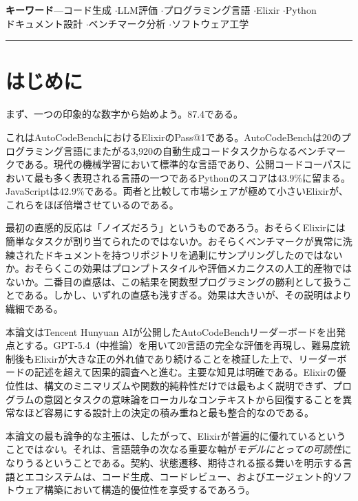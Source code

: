 \documentclass[11pt]{article}
\makeatletter
\newcommand{\acb}{AutoCodeBench}
\newcommand{\passatone}{Pass@1}
\newcommand{\elixir}{Elixir}
\newcommand{\pythonlang}{Python}
\makeatother
\begin{document}
\vspace{0.5em}
{\small\textbf{キーワード}\enspace---\enspace コード生成 \enspace$\cdot$\enspace LLM評価 \enspace$\cdot$\enspace プログラミング言語 \enspace$\cdot$\enspace \elixir{} \enspace$\cdot$\enspace \pythonlang{}\\
ドキュメント設計 \enspace$\cdot$\enspace ベンチマーク分析 \enspace$\cdot$\enspace ソフトウェア工学}

\vspace{0.3em}
\noindent\rule{\textwidth}{0.4pt}
\vspace{0.6em}

\section{はじめに}

まず、一つの印象的な数字から始めよう。87.4である。

これは\acb{}における\elixir{}の\passatone{}である。\acb{}は20のプログラミング言語にまたがる3,920の自動生成コードタスクからなるベンチマークである。現代の機械学習において標準的な言語であり、公開コードコーパスにおいて最も多く表現される言語の一つである\pythonlang{}のスコアは43.9\%に留まる。JavaScriptは42.9\%である。両者と比較して市場シェアが極めて小さい\elixir{}が、これらをほぼ倍増させているのである。

最初の直感的反応は「ノイズだろう」というものであろう。おそらく\elixir{}には簡単なタスクが割り当てられたのではないか。おそらくベンチマークが異常に洗練されたドキュメントを持つリポジトリを過剰にサンプリングしたのではないか。おそらくこの効果はプロンプトスタイルや評価メカニクスの人工的産物ではないか。二番目の直感は、この結果を関数型プログラミングの勝利として扱うことである。しかし、いずれの直感も浅すぎる。効果は大きいが、その説明はより繊細である。

本論文はTencent Hunyuan AIが公開した\acb{}リーダーボード\cite{acb}を出発点とする。GPT-5.4（中推論）を用いて20言語の完全な評価を再現し、難易度統制後も\elixir{}が大きな正の外れ値であり続けることを検証した上で、リーダーボードの記述を超えて因果的調査へと進む。主要な知見は明確である。\elixir{}の優位性は、構文のミニマリズムや関数的純粋性だけでは最もよく説明できず、プログラムの意図とタスクの意味論をローカルなコンテキストから回復することを異常なほど容易にする設計上の決定の積み重ねと最も整合的なのである。

本論文の最も論争的な主張は、したがって、\elixir{}が普遍的に優れているということでは\emph{ない}。それは、言語競争の次なる重要な軸が\emph{モデルにとっての可読性}になりうるということである。契約、状態遷移、期待される振る舞いを明示する言語とエコシステムは、コード生成、コードレビュー、およびエージェント的ソフトウェア構築において構造的優位性を享受するであろう。
\end{document}
